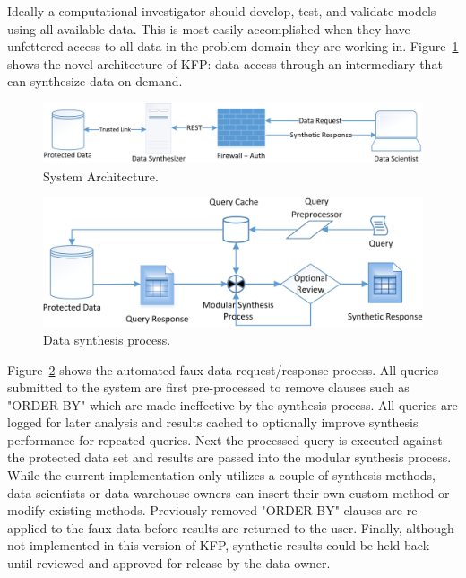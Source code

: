 \documentclass{amia}
\begin{document}
Ideally a computational investigator should develop, test, and validate models using all available data. This is most easily accomplished when they have unfettered access to all data in the problem domain they are working in. Figure~\ref{fig:architecture} shows the novel architecture of KFP: data access through an intermediary that can synthesize data on-demand.

\begin{figure}[ht]
  \centering
  \includegraphics[width=\textwidth]{prototype_architecture}
  \caption{System Architecture.}
  \label{fig:architecture}
\end{figure}
\begin{figure}[ht]
  \centering
  \includegraphics[width=120mm]{data_synthesis_process}
  \caption{Data synthesis process.}
  \label{fig:synthesis_process}
\end{figure}

Figure~\ref{fig:synthesis_process} shows the automated faux-data request/response process. All queries submitted to the system are first pre-processed to remove clauses such as "ORDER BY" which are made ineffective by the synthesis process. All queries are logged for later analysis and results cached to optionally improve synthesis performance for repeated queries. Next the processed query is executed against the protected data set and results are passed into the modular synthesis process. While the current implementation only utilizes a couple of synthesis methods, data scientists or data warehouse owners can insert their own custom method or modify existing methods. Previously removed "ORDER BY" clauses are re-applied to the faux-data before results are returned to the user. Finally, although not implemented in this version of KFP, synthetic results could be held back until reviewed and approved for release by the data owner.
\end{document}
